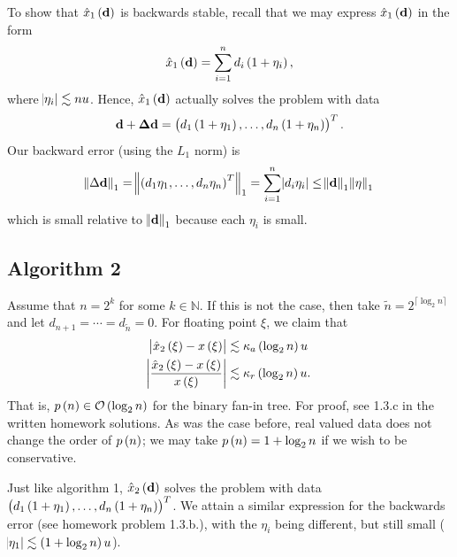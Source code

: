 \documentclass[12pt]{article}
\theoremstyle{definition}
\begin{document}
To show that $\hat{x}_1\del{\mathbf{d}}$ is backwards stable, recall \cite{lec4} that we may express $\hat{x}_1\del{\mathbf{d}}$ in the form
$$
\hat{x}_1\del{\mathbf{d}} = \sum_{i=1}^n d_i\del{1 + \eta_i},
$$
where $\abs{\eta_i} \lesssim nu$. Hence, $\hat{x}_1\del{\mathbf{d}}$ actually solves the problem with data $$\mathbf{d + \Delta d}=\del{d_1\del{1 + \eta_1},  \dots, d_n\del{1 + \eta_n}}^T.$$ Our backward error (using the $L_1$ norm) is
$$
\norm{\Delta \mathbf{d}}_1 = \norm{\del{d_1\eta_1, \dots, d_n\eta_n}^T}_1 = \sum_{i=1}^n\abs{d_i \eta_i} \leq \norm{\mathbf{d}}_1 \norm{\mathbf{\eta}}_1
$$
which is small relative to $\norm{\mathbf{d}}_1$ because each $\eta_i$ is small.

\subsection{Algorithm 2}
Assume that $n = 2^k$ for some $k \in \mathbb{N}$. If this is not the case, then take $\tilde{n} = 2^{\lceil{\log_2 n}\rceil}$ and let $d_{n+1} = \cdots = d_{\tilde{n}} = 0$. For floating point $\xi$, we claim that
\begin{align*}
\abs{\hat{x}_2\del{\xi} - x\del{\xi}} &\lesssim \kappa_a \del{\log_2 n}u \\
\abs{\frac{\hat{x}_2\del{\xi} - x\del{\xi}}{x\del{\xi}}}  &\lesssim \kappa_r\del{\log_2 n}u.
\end{align*}
That is, $p\del{n} \in \mathcal{O}\del{\log_2 n}$ for the binary fan-in tree. For proof, see 1.3.c in the written homework solutions. As was the case before, real valued data does not change the order of $p\del{n}$; we may take $p\del{n} = 1 + \log_2 n$ if we wish to be conservative.



Just like algorithm 1, $\hat{x}_2\del{\mathbf{d}}$ solves the problem with data $\del{d_1\del{1+\eta_1},\dots,d_n\del{1+\eta_n}}^T$. We attain a similar expression for the backwards error (see homework problem 1.3.b.), with the $\eta_i$ being different, but still small ($\abs{\eta_1} \lesssim \del{1+\log_2 n}u$).
\end{document}
